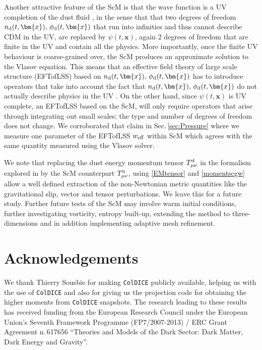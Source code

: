 \documentclass[twocolumn, nofootinbib, showpacs, superscriptaddress]{revtex4-1}
\renewcommand{\H}[0]{{\textsc{h}}}
\renewcommand{\d}[0]{{\rm{d}}}
\newcommand{\vx}[0]{\bm{x} }
\begin{document}
Another attractive feature of the ScM is that the wave function is a UV completion of the dust fluid \cite{UhlemannKoppHaugg2014}, in the sense that that two degrees of freedom $n_\d(t,\vx),\, \phi_\d(t,\vx)$ that run into infinities and thus cannot describe CDM in the UV, are replaced by $\psi(t,\vx)$, again 2 degrees of freedom that are finite in the UV and contain all the physics. More importantly, once the finite UV behaviour is coarse-grained over, the ScM produces an approximate solution to the Vlasov equation.
This means that an effective field theory of large scale structure  (EFTofLSS) based 
on $n_\d(t,\vx),\, \phi_\d(t,\vx)$ has to introduce operators that take into account the 
fact that  $n_\d(t,\vx),\, \phi_\d(t,\vx)$ do not actually describe  physics in the UV  \cite{FloerchingerGarnyTetradisEtal2017}. 
On the other hand, since $\psi(t,\vx)$ is UV complete, an EFTofLSS based on the ScM, will only 
require operators that arise through integrating out small scales; the type and number of degrees of freedom does not change. 
We corroborated that claim in Sec.\,\ref{sec:Pressure} where we measure one parameter of the EFTofLSS $w_{\rm eff}$ 
within ScM which agrees with the same quantity measured using the Vlasov solver.

We note that replacing the dust energy momentum tensor $T^\d_{\mu \nu}$ in the formalism explored in \cite{KUH14} by the ScM counterpart $T^\H_{\mu \nu}$, 
using \eqref{EMtensor} and \eqref{momentscgw} allow a well defined extraction of the non-Newtonian metric quantities 
like the gravitational slip, vector and tensor perturbations.  We leave this for a future study.
Further future tests of the ScM may involve warm initial conditions, further investigating
 vorticity, entropy built-up, extending the method to three-dimensions and in addition implementing adaptive mesh refinement.


\section*{Acknowledgements}
We thank Thierry Sousbie for making \texttt{ColDICE} publicly available, helping us with the use of \texttt{ColDICE} and also for giving us the projection code for obtaining 
the higher moments from \texttt{ColDICE} snapshots.  
The research leading to these results 
has received funding from the European Research Council under the European Union's Seventh Framework 
Programme (FP7/2007-2013) / ERC Grant Agreement n.\,617656 ``Theories and Models of the Dark Sector: Dark Matter, Dark Energy and Gravity''.
\end{document}
